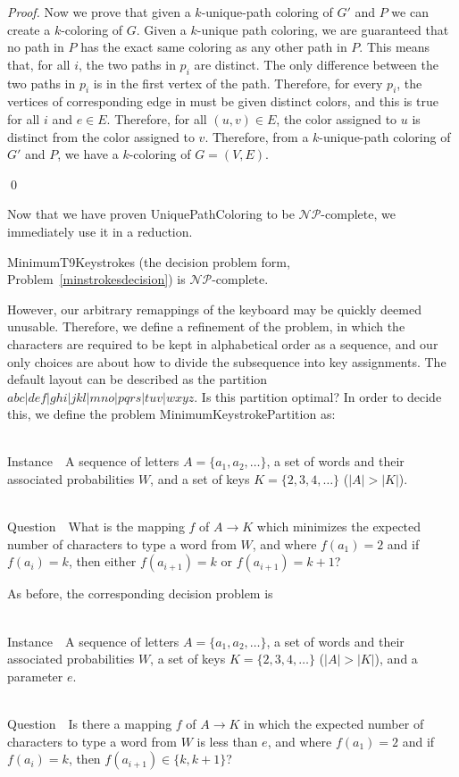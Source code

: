 \documentclass[runningheads]{llncs}
\newcommand{\NP}{\ensuremath{\mathcal{NP}}}
\newcommand{\Instance}{{\sc Instance~}}
\newcommand{\Question}{~\\
{\sc Question~}}
\begin{document}
\begin{proof}
Now we prove that given a $k$-unique-path coloring of $G'$ and $P$ we can
create a $k$-coloring of $G$.  Given a $k$-unique path coloring, we are
guaranteed that no path in $P$ has the exact same coloring as any other path in
$P$.  This means that, for all $i$, the two paths in $p_i$ are distinct.  The
only difference between the two paths in $p_i$ is in the first vertex of the
path.  Therefore, for every $p_i$, the vertices of corresponding edge in must
be given distinct colors, and this is true for all $i$ and $e \in E$.
Therefore, for all $(u,v)\in E$, the color assigned to $u$ is distinct from the
color assigned to $v$.  Therefore, from a $k$-unique-path coloring of $G'$ and
$P$, we have a $k$-coloring of $G=(V,E)$.

\qed 
\end{proof}

Now that we have proven {\sc UniquePathColoring} to be \NP-complete, we
immediately use it in a reduction.  
\begin{theorem}{\sc MinimumT9Keystrokes} (the decision problem form,
Problem~\ref{minstrokesdecision}) is \NP-complete.  \end{theorem}

However, our arbitrary remappings of the keyboard may be quickly deemed unusable.  Therefore, we define a refinement of the problem, in which the characters are required to be kept in alphabetical order as a sequence, and our only choices are about how to divide the subsequence into key assignments.  The default layout can be described as the partition $abc|def|ghi|jkl|mno|pqrs|tuv|wxyz$.  Is this partition optimal?  In order to decide this, we define the problem {\sc MinimumKeystrokePartition} as:
\begin{prob}[{\sc MinimumKeystrokePartition}]~\\
\label{thm:minpartition}
\Instance\ A sequence of letters $A = \{a_1, a_2, \ldots \}$, a set of words and their associated probabilities $W$, and a set of keys $K = \{2, 3, 4, \ldots \}$ ($|A| > |K|$).

\Question\ What is the mapping $f$ of $A \to K$ which minimizes the expected number of characters to type a word from $W$, and where $f(a_1) = 2$ and if $f(a_i) = k$, then either $f(a_{i+1}) = k$ or $f(a_{i+1}) = k+1$?
\end{prob}

As before, the corresponding decision problem is
\begin{prob}~\\
\Instance\ A sequence of letters $A = \{a_1, a_2, \ldots \}$, a set of words and their associated probabilities $W$, a set of keys $K = \{2, 3, 4, \ldots \}$ ($|A| > |K|$), and a parameter $e$.

\Question\ Is there a mapping $f$ of $A \to K$ in which the expected number of characters to type a word from $W$ is less than $e$, and where $f(a_1) = 2$ and if $f(a_i) = k$, then $f(a_{i+1}) \in \{k, k+1\}$?
\end{prob}
\end{document}
